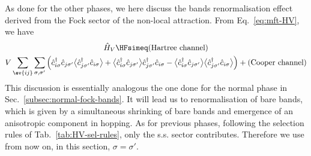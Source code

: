 As done for the other phases, we here discuss the bands renormalisation effect derived from the Fock sector of the non-local attraction. From Eq.~\eqref{eq:mft-HV}, we have
\begin{multline*}
	\hat H_V \HFsimeq (\text{Hartree channel}) \\
	V \sum_{\ev{ij}} \sum_{\sigma,\sigma'} \Big(
	\hat c_{i\sigma}^\dagger \hat c_{j\sigma'} \big\langle \hat c_{j\sigma'}^\dagger \hat c_{i\sigma} \big\rangle + \big\langle \hat c_{i\sigma}^\dagger \hat c_{j\sigma'} \big\rangle \hat c_{j\sigma'}^\dagger \hat c_{i\sigma} - \big\langle \hat c_{i\sigma}^\dagger \hat c_{j\sigma'} \big\rangle  \big\langle \hat c_{j\sigma'}^\dagger \hat c_{i\sigma} \big\rangle \Big)
	+ (\text{Cooper channel})
\end{multline*}
This discussion is essentially analogous the one done for the normal phase in Sec.~\ref{subsec:normal-fock-bands}. It will lead us to renormalisation of bare bands, which is given by a simultaneous shrinking of bare bands and emergence of an anisotropic component in hopping. As for previous phases, following the selection rules of Tab.~\ref{tab:HV-sel-rules}, only the s.s. sector contributes. Therefore we use from now on, in this section, $\sigma=\sigma'$.

